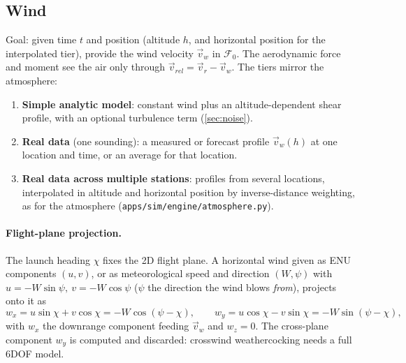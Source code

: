 \subsection{Wind}\label{sec:wind}
Goal: given time $t$ and position (altitude $h$, and horizontal position for the interpolated
tier), provide the wind velocity $\vec{v}_w$ in $\mathcal{F}_0$. The aerodynamic force and moment
see the air only through $\vec{v}_{rel} = \vec{v}_r - \vec{v}_w$. The tiers mirror the atmosphere:
\begin{enumerate}
    \item \textbf{Simple analytic model}: constant wind plus an altitude-dependent shear profile,
    with an optional turbulence term (\autoref{sec:noise}).
    \item \textbf{Real data} (one sounding): a measured or forecast profile $\vec{v}_w(h)$ at one
    location and time, or an average for that location.
    \item \textbf{Real data across multiple stations}: profiles from several locations,
    interpolated in altitude and horizontal position by inverse-distance weighting, as for the
    atmosphere (\texttt{apps/sim/engine/atmosphere.py}).
\end{enumerate}

\paragraph{Flight-plane projection.} The launch heading $\chi$ fixes the 2D flight plane. A
horizontal wind given as ENU components $(u,v)$, or as meteorological speed and direction
$(W,\psi)$ with $u=-W\sin\psi,\ v=-W\cos\psi$ ($\psi$ the direction the wind blows \emph{from}),
projects onto it as
\begin{equation}
    w_x = u\sin\chi + v\cos\chi = -W\cos(\psi-\chi), \qquad
    w_y = u\cos\chi - v\sin\chi = -W\sin(\psi-\chi),
\end{equation}
with $w_x$ the downrange component feeding $\vec{v}_w$ and $w_z=0$. The cross-plane component
$w_y$ is computed and discarded: crosswind weathercocking needs a full 6DOF model.

